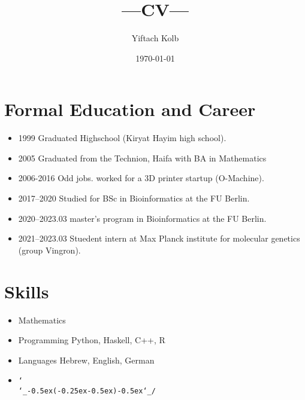 \documentclass[a4paper,10pt]{article}
\def\shrug{\texttt{\raisebox{0.75em}{\char`\_}\char`\\\char`\_\kern-0.5ex(\kern-0.25ex\raisebox{0.25ex}{\rotatebox{45}{\raisebox{-.75ex}"\kern-1.5ex\rotatebox{-90})}}\kern-0.5ex)\kern-0.5ex\char`\_/\raisebox{0.75em}{\char`\_}}}
\begin{document}




\title{---CV---}
\author{Yiftach Kolb}
\date{\today}

\maketitle

\section*{Formal Education and Career}

\begin{itemize}
\item{1999} Graduated Highschool (Kiryat Hayim high school).
\item{2005} Graduated from the Technion, Haifa with BA in Mathematics
\item{2006-2016} Odd jobs.
worked for a 3D printer startup (O-Machine).
\item{2017--2020} Studied for BSc in Bioinformatics at the FU Berlin.
\item{2020--2023.03} master's program in Bioinformatics at the FU Berlin.
\item{2021--2023.03} Stuedent intern at Max Planck institute for molecular genetics (group Vingron).
\end{itemize}

\section*{Skills}
\begin{itemize}
\item{Mathematics}
\item{Programming}
\subitem{} Python, Haskell, C++, R
\item{Languages}
\subitem{} Hebrew, English, German
\item{}
\subitem{}
\normalsize\shrug


\end{itemize}



\nocite{mpgvaeRepo}
\nocite{mg22Repo}
\printbibliography
\end{document}
